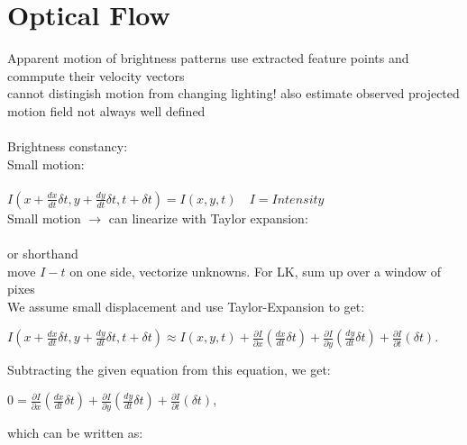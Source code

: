 \section{Optical Flow}
Apparent motion of brightness patterns use extracted feature points and commpute their velocity vectors \\
 cannot distingish motion from changing lighting! also estimate observed projected motion field  not always well defined \\
 \\
Brightness constancy: \\
Small motion: \\
\\
$I(x + \frac{dx}{dt}\delta t, y + \frac{dy}{dt} \delta t, t + \delta t) = I(x, y, t)
 \quad I = Intensity$\\
Small motion $\rightarrow$ can linearize with Taylor expansion:\\
 \\
 or shorthand \\
move $I-t$ on one side, vectorize unknowns. For LK, sum up over a window of pixes\\
We assume small displacement and use Taylor-Expansion to get:

$ I(x + \frac{dx}{dt}\delta t, y + \frac{dy}{dt}\delta t, t + \delta t) \approx I(x,y,t) + \frac{\partial I}{\partial x}(\frac{dx}{dt}\delta t) + \frac{\partial I}{\partial y}(\frac{dy}{dt}\delta t) + \frac{\partial I}{\partial t}(\delta t) $.

Subtracting the given equation from this equation, we get:

$0 = \frac{\partial I}{\partial x}(\frac{dx}{dt}\delta t) + \frac{\partial I}{\partial y}(\frac{dy}{dt}\delta t) + \frac{\partial I}{\partial t}(\delta t)$,

which can be written as:

